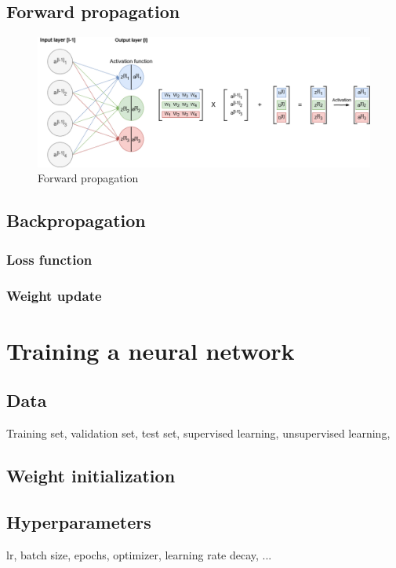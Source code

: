 \subsection{Forward propagation}

\begin{figure}[!h]
\centering
\includegraphics[width=1\textwidth, keepaspectratio=true]{./figures/forward_propagation.png}
\caption{Forward propagation }
\label{forward_propagation}
\end{figure}


\subsection{Backpropagation}

\subsubsection{Loss function}

\subsubsection{Weight update}




\section{Training a neural network}

\subsection{Data}
Training set, validation set, test set, supervised learning, unsupervised learning,

\subsection{Weight initialization}

\subsection{Hyperparameters}
lr, batch size, epochs, optimizer, learning rate decay, ...




